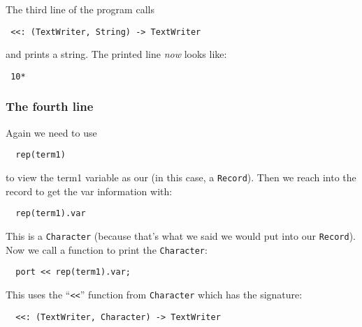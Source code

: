 The third line of the program calls 
 
\begin{small}
\begin{verbatim}
 <<: (TextWriter, String) -> TextWriter
\end{verbatim}
\end{small}

and prints a \ttin{*} string. The printed line {\em now\/} looks like:

\begin{small}
\begin{verbatim}
 10*
\end{verbatim}
\end{small}

\subsubsection{The fourth line}

Again we need to use

\begin{small}
\begin{verbatim}
  rep(term1)
\end{verbatim}
\end{small}

to view the term1 variable as our  (in this case, a \verb"Record"). 
Then we reach into the record to get the var information with:

\begin{small}
\begin{verbatim}
  rep(term1).var
\end{verbatim}
\end{small}

This is a \verb"Character" (because that's what we said we would put into 
our \verb"Record"). Now we call a function to print the \verb"Character":

\begin{small}
\begin{verbatim}
  port << rep(term1).var;
\end{verbatim}
\end{small}

This uses the ``\verb+<<+'' function from \verb"Character" which has the signature:

\begin{small}
\begin{verbatim}
  <<: (TextWriter, Character) -> TextWriter
\end{verbatim}
\end{small}


